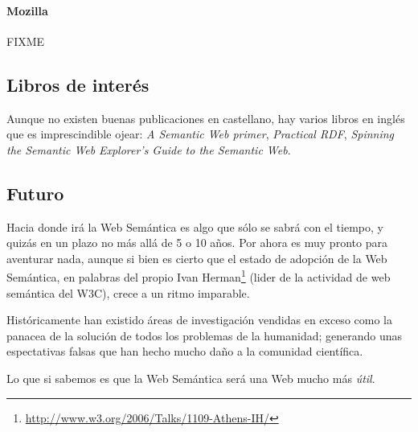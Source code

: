 \paragraph{Mozilla}

FIXME

\subsection{Libros de interés}

Aunque no existen buenas publicaciones en castellano, hay varios libros en inglés 
que es imprescindible ojear: \emph{A Semantic Web primer}\cite{SemanticWebPrimer},
\emph{Practical RDF}\cite{PracticalRDF}, 
\emph{Spinning the Semantic Web}\cite{SpinningSemanticWeb}
\emph{Explorer's Guide to the Semantic Web}\cite{ExplorerSemanticWeb}.

\subsection{Futuro}

Hacia donde irá la Web Semántica es algo que sólo se sabrá con el tiempo, y quizás
en un plazo no más allá de 5 o 10 años. Por ahora es muy pronto para aventurar nada,
aunque si bien es cierto que el estado de adopción de la Web Semántica, en palabras
del propio Ivan Herman\footnote{\url{http://www.w3.org/2006/Talks/1109-Athens-IH/}}
(lider de la actividad de web semántica del W3C), crece a un ritmo imparable.

Históricamente han existido áreas de investigación vendidas en exceso como la 
panacea de la solución de todos los problemas de la humanidad; generando unas 
espectativas falsas que han hecho mucho daño a la comunidad científica.

Lo que si sabemos es que la Web Semántica será una Web mucho más \emph{útil}.
